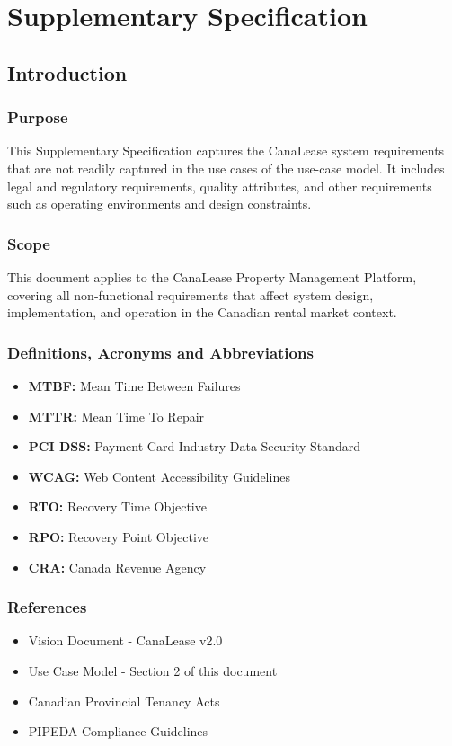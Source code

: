 \documentclass[12pt]{article}
\begin{document}

\section{Supplementary Specification}

\subsection{Introduction}

\subsubsection{Purpose}
This Supplementary Specification captures the CanaLease system requirements that are not readily captured in the use cases of the use-case model. It includes legal and regulatory requirements, quality attributes, and other requirements such as operating environments and design constraints.

\subsubsection{Scope}
This document applies to the CanaLease Property Management Platform, covering all non-functional requirements that affect system design, implementation, and operation in the Canadian rental market context.

\subsubsection{Definitions, Acronyms and Abbreviations}
\begin{itemize}
    \item \textbf{MTBF:} Mean Time Between Failures
    \item \textbf{MTTR:} Mean Time To Repair
    \item \textbf{PCI DSS:} Payment Card Industry Data Security Standard
    \item \textbf{WCAG:} Web Content Accessibility Guidelines
    \item \textbf{RTO:} Recovery Time Objective
    \item \textbf{RPO:} Recovery Point Objective
    \item \textbf{CRA:} Canada Revenue Agency
\end{itemize}

\subsubsection{References}
\begin{itemize}
    \item Vision Document - CanaLease v2.0
    \item Use Case Model - Section 2 of this document
    \item Canadian Provincial Tenancy Acts
    \item PIPEDA Compliance Guidelines
\end{itemize}
\end{document}
